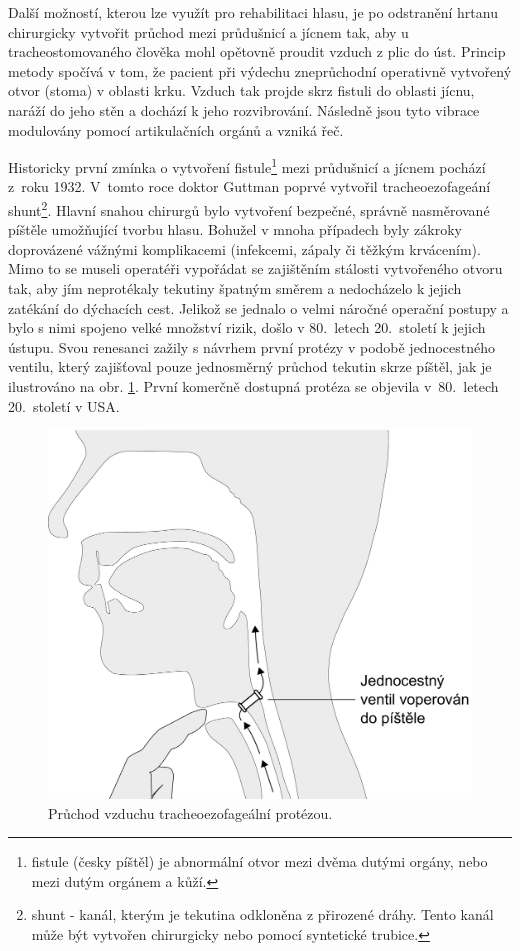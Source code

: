 Další možností, kterou lze využít pro rehabilitaci hlasu, je po odstranění hrtanu chirurgicky vytvořit průchod 
mezi průdušnicí a jícnem tak, aby u tracheostomovaného člověka mohl opětovně proudit vzduch z plic do úst. 
Princip metody spočívá v tom, že pacient při výdechu zneprůchodní operativně vytvořený otvor (stoma) v oblasti krku. Vzduch tak projde skrz fistuli do oblasti jícnu, naráží do jeho stěn a dochází k jeho rozvibrování. Následně jsou tyto vibrace modulovány pomocí artikulačních orgánů a vzniká řeč.

Historicky první zmínka o vytvoření fistule\footnote{fistule (česky píštěl) je abnormální
otvor mezi dvěma dutými orgány, nebo mezi dutým orgánem a kůží.} mezi
průdušnicí a jícnem pochází z~roku 1932. V~tomto roce doktor Guttman poprvé
vytvořil tracheoezofageání shunt\footnote{shunt - kanál, kterým je tekutina
odkloněna z přirozené dráhy. Tento kanál může být vytvořen chirurgicky nebo pomocí syntetické trubice. }.
Hlavní snahou chirurgů bylo vytvoření bezpečné, správně nasměrované píštěle
umožňující tvorbu hlasu. Bohužel v mnoha případech byly zákroky doprovázené
vážnými komplikacemi (infekcemi, zápaly či těžkým krvácením). 
Mimo to se museli operatéři vypořádat se zajištěním stálosti
vytvořeného otvoru tak, aby jím neprotékaly tekutiny špatným směrem a
nedocházelo k jejich zatékání do dýchacích cest. Jelikož se jednalo o velmi
náročné operační postupy a bylo s nimi spojeno velké množství rizik, došlo v
80.~letech 20.~století k jejich ústupu. Svou renesanci zažily s návrhem první protézy v podobě jednocestného ventilu, který zajišťoval pouze jednosměrný
průchod tekutin skrze píštěl, jak je ilustrováno na obr.
\ref{fig:cause:treatment:shunt}. První komerčně dostupná protéza se objevila
v~80.~letech 20.~století v USA.  

\begin{figure}[htb]
  \begin{center}
    \includegraphics[width=0.6\linewidth]{ch3-cause/figures/te-shunt}
    \caption[Průchod vzduchu tracheoezofageální protézou.]{Průchod vzduchu tracheoezofageální protézou.}
    \label{fig:cause:treatment:shunt}
  \end{center}
\end{figure}


